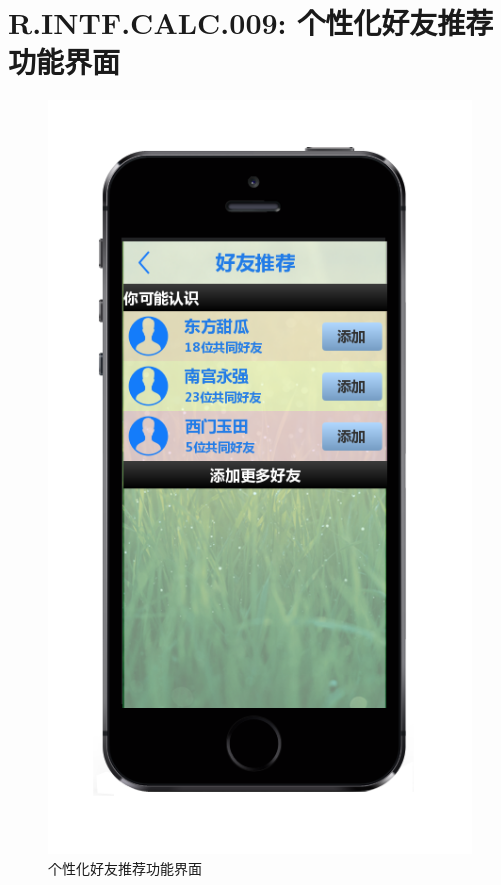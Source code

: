     \section{R.INTF.CALC.009: 个性化好友推荐功能界面}
    \begin{figure}[h]
        \centering
        \includegraphics[scale=0.6]{OutlineDesign/figures/个性化好友推荐功能界面.png}
        \caption{个性化好友推荐功能界面}
        \label{fig:server_flow}
    \end{figure}
    \newpage
